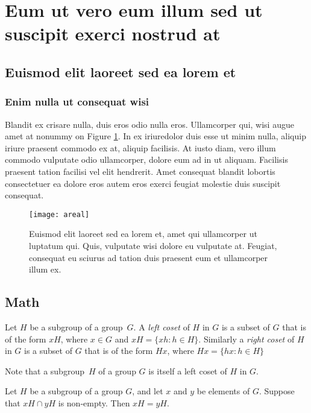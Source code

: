 \section{Eum ut vero eum illum sed ut suscipit exerci nostrud at}

\subsection{Euismod elit laoreet sed ea lorem et}
\subsubsection{Enim nulla ut consequat wisi}
Blandit ex crisare nulla, duis eros\cite{suscipit} odio nulla eros. Ullamcorper qui, wisi augue amet at nonummy on Figure \ref{fig:areal}. In ex iriuredolor duis esse ut minim nulla, aliquip iriure praesent commodo ex at, aliquip facilisis. At iusto diam, vero illum commodo vulputate odio ullamcorper, dolore eum ad in ut aliquam. Facilisis\cite{aliquam} praesent tation facilisi vel elit hendrerit. Amet consequat blandit lobortis consectetuer ea dolore eros autem eros exerci feugiat molestie duis suscipit consequat. 

\begin{figure}[!ht]
	\centering
		\texttt{[image: areal]}
	\caption{Euismod elit laoreet sed ea lorem et, amet qui ullamcorper ut luptatum qui. Quis, vulputate wisi dolore eu vulputate at. Feugiat, consequat eu sciurus ad tation duis praesent eum et ullamcorper illum ex.}
	\label{fig:areal}
\end{figure}
\pagebreak

\subsection{Math}
\begin{definition}
Let $H$ be a subgroup of a group~$G$.  A \emph{left coset}
of $H$ in $G$ is a subset of $G$ that is of the form $xH$,
where $x \in G$ and $xH = \{ xh : h \in H \}$.
Similarly a \emph{right coset} of $H$ in $G$ is a subset
of $G$ that is of the form $Hx$, where
$Hx = \{ hx : h \in H \}$
\end{definition}

Note that a subgroup~$H$ of a group $G$ is itself a
left coset of $H$ in $G$.

\begin{lemma}
\label{LeftCosetsDisjoint}
Let $H$ be a subgroup of a group $G$, and let $x$ and $y$ be
elements of $G$.  Suppose that $xH \cap yH$ is non-empty.
Then $xH = yH$.
\end{lemma}

